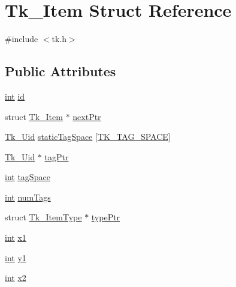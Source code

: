 \hypertarget{struct_tk___item}{}\section{Tk\+\_\+\+Item Struct Reference}
\label{struct_tk___item}


{\ttfamily \#include $<$tk.\+h$>$}

\subsection*{Public Attributes}
\begin{DoxyCompactItemize}
\item 
\hyperlink{tk_8h_a83f82f76e7fed06f4c49d2db94028a6d}{int} \hyperlink{struct_tk___item_a3975709657bbd095e05b41e8b0cc1cf2}{id}
\item 
struct \hyperlink{struct_tk___item}{Tk\+\_\+\+Item} $\ast$ \hyperlink{struct_tk___item_a6c418b231340a944319106b60a4b2b04}{next\+Ptr}
\item 
\hyperlink{tk_8h_aab6f7e0c4f113c8e02feee260e7c4414}{Tk\+\_\+\+Uid} \hyperlink{struct_tk___item_abf015c60d26597fbc5ed25ee4247c8d0}{static\+Tag\+Space} \mbox{[}\hyperlink{tk_8h_ad117703fe867d3b06d13ae81353cc6cb}{T\+K\+\_\+\+T\+A\+G\+\_\+\+S\+P\+A\+CE}\mbox{]}
\item 
\hyperlink{tk_8h_aab6f7e0c4f113c8e02feee260e7c4414}{Tk\+\_\+\+Uid} $\ast$ \hyperlink{struct_tk___item_a28c591367d6cc332e0be57ebc04af75e}{tag\+Ptr}
\item 
\hyperlink{tk_8h_a83f82f76e7fed06f4c49d2db94028a6d}{int} \hyperlink{struct_tk___item_a33559e8870c9e3f4623119185c54a8da}{tag\+Space}
\item 
\hyperlink{tk_8h_a83f82f76e7fed06f4c49d2db94028a6d}{int} \hyperlink{struct_tk___item_aae8bc2476c4906d39b0c0898ba7b3cca}{num\+Tags}
\item 
struct \hyperlink{struct_tk___item_type}{Tk\+\_\+\+Item\+Type} $\ast$ \hyperlink{struct_tk___item_a2b274e7dd5f04d40a45bf43cb8d5abae}{type\+Ptr}
\item 
\hyperlink{tk_8h_a83f82f76e7fed06f4c49d2db94028a6d}{int} \hyperlink{struct_tk___item_a0fb4908b6598afb490737ae7149d4cd8}{x1}
\item 
\hyperlink{tk_8h_a83f82f76e7fed06f4c49d2db94028a6d}{int} \hyperlink{struct_tk___item_a019374f8a73a4f99e56dcb989bd75c1e}{y1}
\item 
\hyperlink{tk_8h_a83f82f76e7fed06f4c49d2db94028a6d}{int} \hyperlink{struct_tk___item_a92ad5cc59f538b798b89d2e9b06e73ce}{x2}
\item 

\end{DoxyCompactItemize}
